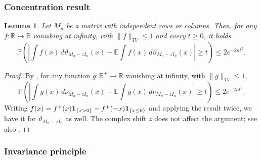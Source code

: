 \documentclass[11pt,oneside]{amsart}
\theoremstyle{plain}
\newtheorem{lemma}[theorem]{Lemma}
\numberwithin{equation}{section}
\newcommand{\E}{\mathbb{E}}
\newcommand{\p}{\mathbb{P}}
\newcommand{\one}{\textup{\textbf{1}}}
\begin{document}
\subsubsection{Concentration result}
\begin{lemma} \label{lemma:concentration}
    Let $M_n$ be a matrix with independent rows or columns. Then, for any $f:\mathbb{R}\to \mathbb{R}$ vanishing at infinity, with $\|f\|_{TV}\le 1$ and every $t\ge 0$, it holds
    \begin{equation}
        \p\left(\left|\int f(x) \, d\vartheta_{M_n-zI_n}(x)-\E\int f(x) \, d\vartheta_{M_n-zI_n}(x)\right|\ge t\right) \le 2e^{-2nt^2}.
    \end{equation}
\end{lemma}
\begin{proof}
     By {\cite[Lemma 4.18]{BC}}, for any function $g:\mathbb{R}^+ \to \mathbb{R}$ vanishing at infinity, with $\|g\|_{TV}\le 1$,
        \begin{equation}
        \p\left(\left|\int g(x) \, d\nu_{M_n-zI_n}(x)-\E\int g(x) \, d\nu_{M_n-zI_n}(x)\right|\ge t\right) \le 2e^{-2nt^2}.
    \end{equation}
    Writing $f(x)=f^+(x)\one_{\{x>0\}}-f^+(-x)\one_{\{x\le 0\}}$ and applying the result twice, we have it for $\vartheta_{M_n-zI_n}$ as well. The complex shift $z$ does not affect the argument; see also \cite{BCC14}. 
\end{proof}
\subsubsection{Invariance principle}
\end{document}
